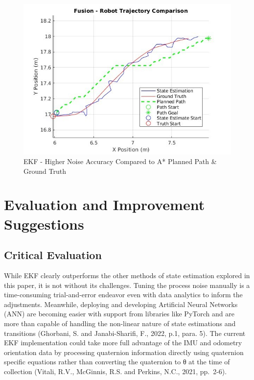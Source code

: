 \documentclass[
  letterpaper,
  DIV=11,
  numbers=noendperiod]{scrartcl}
\begin{document}
\begin{figure}

{\centering \includegraphics{ekf-high-noise.png}

}

\caption{\label{fig-ekf-high-noise}EKF - Higher Noise Accuracy Compared
to A* Planned Path \& Ground Truth}

\end{figure}

\hypertarget{evaluation-and-improvement-suggestions}{%
\section{Evaluation and Improvement
Suggestions}\label{evaluation-and-improvement-suggestions}}

\hypertarget{critical-evaluation}{%
\subsection{Critical Evaluation}\label{critical-evaluation}}

While EKF clearly outperforms the other methods of state estimation
explored in this paper, it is not without its challenges. Tuning the
process noise manually is a time-consuming trial-and-error endeavor even
with data analytics to inform the adjustments. Meanwhile, deploying and
developing Artificial Neural Networks (ANN) are becoming easier with
support from libraries like PyTorch and are more than capable of
handling the non-linear nature of state estimations and transitions
(Ghorbani, S. and Janabi-Sharifi, F., 2022, p.1, para. 5). The current
EKF implementation could take more full advantage of the IMU and
odometry orientation data by processing quaternion information directly
using quaternion specific equations rather than converting the
quaternion to θ at the time of collection (Vitali, R.V., McGinnis, R.S.
and Perkins, N.C., 2021, pp.~2-6).
\end{document}
